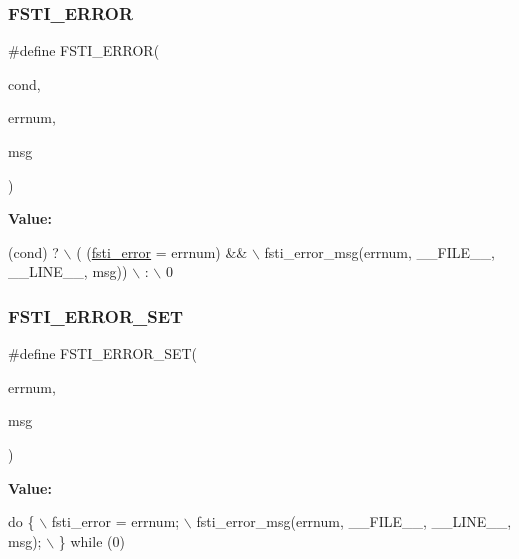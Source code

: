\subsubsection{\texorpdfstring{F\+S\+T\+I\+\_\+\+E\+R\+R\+OR}{FSTI\_ERROR}}
{\footnotesize\ttfamily \#define F\+S\+T\+I\+\_\+\+E\+R\+R\+OR(\begin{DoxyParamCaption}\item[{}]{cond,  }\item[{}]{errnum,  }\item[{}]{msg }\end{DoxyParamCaption})}

{\bfseries Value\+:}
\begin{DoxyCode}
(cond) ?                            \(\backslash\)
           ( (\mbox{\hyperlink{fsti-error_8h_a2fa89546149e592da51f9cd5324ddb1a}{fsti\_error}} = errnum) &&             \(\backslash\)
               fsti\_error\_msg(errnum, \_\_FILE\_\_, \_\_LINE\_\_, msg)) \(\backslash\)
           :                            \(\backslash\)
           0
\end{DoxyCode}
\mbox{\label{fsti-error_8h_a661c772e7b1d385f3b4f667ae01905e9}} 
\subsubsection{\texorpdfstring{F\+S\+T\+I\+\_\+\+E\+R\+R\+O\+R\+\_\+\+S\+ET}{FSTI\_ERROR\_SET}}
{\footnotesize\ttfamily \#define F\+S\+T\+I\+\_\+\+E\+R\+R\+O\+R\+\_\+\+S\+ET(\begin{DoxyParamCaption}\item[{}]{errnum,  }\item[{}]{msg }\end{DoxyParamCaption})}

{\bfseries Value\+:}
\begin{DoxyCode}
\textcolor{keywordflow}{do} \{                                \(\backslash\)
        fsti\_error = errnum;                    \(\backslash\)
        fsti\_error\_msg(errnum, \_\_FILE\_\_, \_\_LINE\_\_, msg);    \(\backslash\)
    \} \textcolor{keywordflow}{while} (0)
\end{DoxyCode}
\mbox{\label{fsti-error_8h_a2c5ec410c3efe4eab60017e594b33bbf}} 
